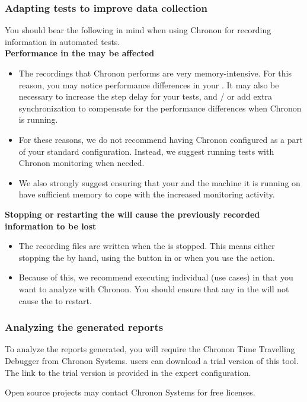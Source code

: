 \subsubsection{Adapting tests to improve data collection}
You should bear the following in mind when using Chronon for recording information in automated tests.\\

\textbf{Performance in the \gdaut{} may be affected}
\begin{itemize}
\item The recordings that Chronon performs are very memory-intensive. For this reason, you may notice performance differences in your \gdaut{}. It may also be necessary to increase the step delay for your tests, and / or add extra synchronization to compensate for the performance differences when Chronon is running. 
\item For these reasons, we do not recommend having Chronon configured as a part of your standard \gdaut{} configuration. Instead, we suggest running tests with Chronon monitoring when needed. 
\item We also strongly suggest ensuring that your \gdaut{} and the machine it is running on have sufficient memory to cope with the increased monitoring activity.
\end{itemize}

\textbf{Stopping or restarting the \gdaut{} will cause the previously recorded information to be lost}
\begin{itemize}
\item The recording files are written when the \gdaut{} is stopped. This means either stopping the \gdaut{} by hand, using the  button in \app{} or when you use the  action. 
\item Because of this, we recommend executing individual \gdcases{} (use cases) in \gdsuites{} that you want to analyze with Chronon. You should ensure that any \gdehandlers{} in the \gdsuite{} will not cause the \gdaut{} to restart.
\end{itemize}

\subsubsection{Analyzing the generated reports}
\label{TasksChrononTools}
To analyze the reports generated, you will require the Chronon Time Travelling Debugger from Chronon Systems. \app{} users can download a trial version of this tool. The link to the trial version is provided in the expert \gdaut{} configuration.

Open source projects may contact Chronon Systems for free licenses. 


